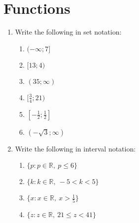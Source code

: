 \chapter{Functions}
\begin{exercises}{}
{
\begin{enumerate}[noitemsep, label=\textbf{\arabic*}. ] 
\item Write the following in set notation:
\begin{multicols}{2}
\begin{enumerate}[noitemsep, label=\textbf{(\alph*)} ] 
 \item $(-\infty; 7]$
\item $[13; 4)$
\item $(35; \infty)$
\item $[\frac{3}{4}; 21)$
\item $[-\frac{1}{2}; \frac{1}{2}]$
\item $(-\sqrt{3}; \infty)$
\end{enumerate}
\end{multicols}
\item Write the following in interval notation:
\begin{multicols}{2}
\begin{enumerate}[noitemsep, label=\textbf{(\alph*)} ] 
 \item $\{p: p \in \mathbb{R},~ p \leq 6\}$
 \item $\{k: k \in \mathbb{R},~ -5 < k < 5\}$
 \item $\{x: x \in \mathbb{R},~ x > \frac{1}{5}\}$
 \item $\{z: z \in \mathbb{R},~ 21 \leq z < 41\}$
\end{enumerate}
\end{multicols}
\end{enumerate}

} 
\end{exercises}


